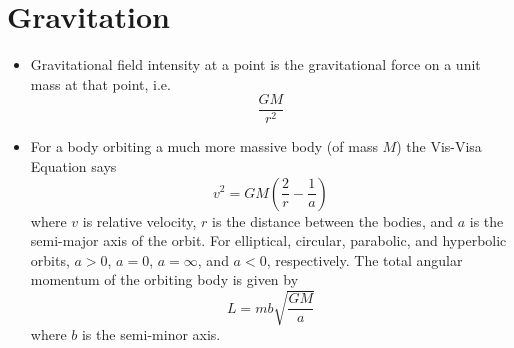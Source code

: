 \documentclass{scrartcl}
\begin{document}
    \section{Gravitation}
    \begin{itemize}
        \item Gravitational field intensity at a point is the gravitational force on a unit mass at that point, i.e. \[\frac{GM}{r^2}\]
        \item For a body orbiting a much more massive body (of mass $M$) the Vis-Visa Equation says \[v^2=GM\left(\frac2r-\frac1a\right)\] where $v$  is relative velocity, $r$ is the distance between the bodies, and $a$ is the semi-major axis of the orbit. For elliptical, circular, parabolic, and hyperbolic orbits, $a>0$, $a=0$, $a=\infty$, and $a<0$, respectively. The total angular momentum of the orbiting body is given by \[L=mb\sqrt{\frac{GM}a}\]  where $b$  is the semi-minor axis.
    \end{itemize}
\end{document}
